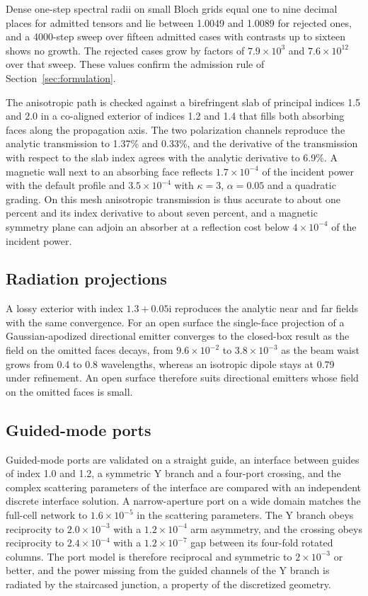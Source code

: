 \documentclass[11pt,a4paper]{article}
\begin{document}
Dense one-step spectral radii on small Bloch grids equal one to nine decimal places for admitted tensors and lie between 1.0049 and 1.0089 for rejected ones, and a 4000-step sweep over fifteen admitted cases with contrasts up to sixteen shows no growth. The rejected cases grow by factors of $7.9\times10^{3}$ and $7.6\times10^{12}$ over that sweep. These values confirm the admission rule of Section~\ref{sec:formulation}.

The anisotropic path is checked against a birefringent slab of principal indices 1.5 and 2.0 in a co-aligned exterior of indices 1.2 and 1.4 that fills both absorbing faces along the propagation axis. The two polarization channels reproduce the analytic transmission to 1.37\% and 0.33\%, and the derivative of the transmission with respect to the slab index agrees with the analytic derivative to 6.9\%. A magnetic wall next to an absorbing face reflects $1.7\times10^{-4}$ of the incident power with the default profile and $3.5\times10^{-4}$ with $\kappa=3$, $\alpha=0.05$ and a quadratic grading. On this mesh anisotropic transmission is thus accurate to about one percent and its index derivative to about seven percent, and a magnetic symmetry plane can adjoin an absorber at a reflection cost below $4\times10^{-4}$ of the incident power.

\subsection{Radiation projections}

A lossy exterior with index $1.3+0.05\mathrm{i}$ reproduces the analytic near and far fields with the same convergence. For an open surface the single-face projection of a Gaussian-apodized directional emitter converges to the closed-box result as the field on the omitted faces decays, from $9.6\times10^{-2}$ to $3.8\times10^{-3}$ as the beam waist grows from 0.4 to 0.8 wavelengths, whereas an isotropic dipole stays at 0.79 under refinement. An open surface therefore suits directional emitters whose field on the omitted faces is small.

\subsection{Guided-mode ports}

Guided-mode ports are validated on a straight guide, an interface between guides of index 1.0 and 1.2, a symmetric Y branch and a four-port crossing, and the complex scattering parameters of the interface are compared with an independent discrete interface solution. A narrow-aperture port on a wide domain matches the full-cell network to $1.6\times10^{-5}$ in the scattering parameters. The Y branch obeys reciprocity to $2.0\times10^{-3}$ with a $1.2\times10^{-4}$ arm asymmetry, and the crossing obeys reciprocity to $2.4\times10^{-4}$ with a $1.2\times10^{-7}$ gap between its four-fold rotated columns. The port model is therefore reciprocal and symmetric to $2\times10^{-3}$ or better, and the power missing from the guided channels of the Y branch is radiated by the staircased junction, a property of the discretized geometry.
\end{document}

